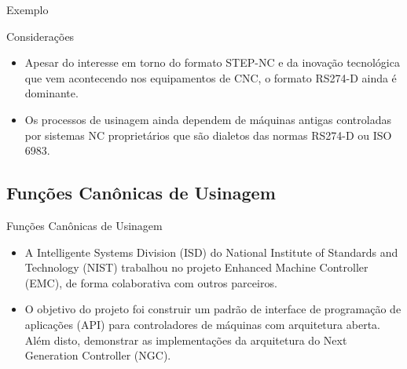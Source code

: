 \documentclass[aspectratio=169]{beamer}
\begin{document}
{\begin{frame}{Exemplo}
\end{frame}


\begin{frame}{Considerações}

  \begin{itemize}
    \item {
      Apesar do interesse em torno do formato STEP-NC e da inovação tecnológica
      que vem acontecendo nos equipamentos de CNC, o formato RS274-D ainda é dominante.
    }
    \item {
      Os processos de usinagem ainda dependem de máquinas antigas controladas
      por sistemas NC proprietários que são dialetos das normas RS274-D ou ISO 6983.
    }
  \end{itemize}   

\end{frame}


\subsection{Funções Canônicas de Usinagem}

\begin{frame}{Funções Canônicas de Usinagem}
  \begin{itemize}
    \item{
      A Intelligente Systems Division (ISD) do National Institute of 
      Standards and Technology (NIST) trabalhou no projeto 
      Enhanced Machine Controller (EMC), de forma colaborativa com 
      outros parceiros.
    }
    \item {
      O objetivo do projeto foi construir um padrão de interface de 
      programação de aplicações (API) para controladores de máquinas 
      com arquitetura aberta. 
      Além disto, demonstrar as implementações da arquitetura do 
      Next Generation Controller (NGC).
    }
  \end{itemize}
\end{frame}


}
\end{document}
